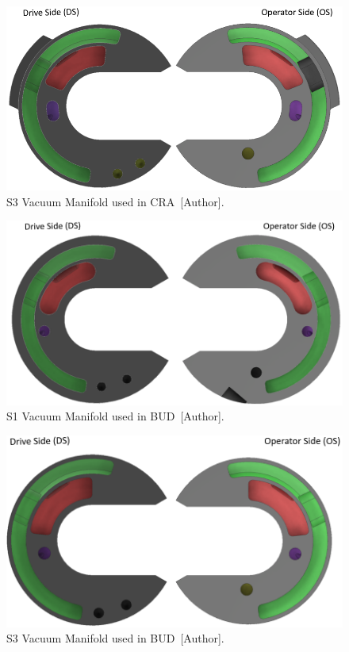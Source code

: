 \begin{figure}[H]
    \centering
    \includegraphics[width=1\linewidth]{FIGURES/S3CRAMan.png}
    \caption{S3 Vacuum Manifold used in CRA~[Author].}
    \label{CRAMan2}
\end{figure}

\begin{figure}[H]
    \centering
    \includegraphics[width=1\linewidth]{FIGURES/S1BUDMan.png}
    \caption{S1 Vacuum Manifold used in BUD~[Author].}
    \label{BUDMan1}
\end{figure}

\begin{figure}[H]
    \centering
    \includegraphics[width=1\linewidth]{FIGURES/S3BUDMan.png}
    \caption{S3 Vacuum Manifold used in BUD~[Author].}
    \label{BUDMan2}
\end{figure}
\clearpage

